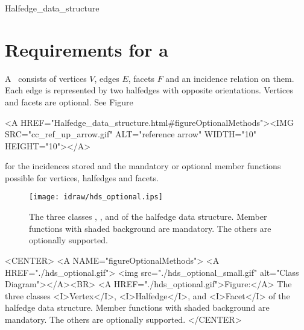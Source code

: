 \ccHtmlNoClassToc
\begin{ccClass}{Halfedge_data_structure}
\section{Requirements for a \protect{}}
\label{sectionHds}
\def\ccTagRmTrailingConst{\ccFalse}

\ccDefinition  

A \ccClassTemplateName\ consists of vertices $V$, edges $E$, facets
$F$ and an incidence relation on them.  Each edge is represented by
two halfedges with opposite orientations. Vertices and facets are
optional. See 
Figure~\ccTexHtml{\ref{figureOptionalMethods}}{}\begin{ccHtmlOnly}
  <A HREF="Halfedge_data_structure.html#figureOptionalMethods"><IMG 
  SRC="cc_ref_up_arrow.gif" ALT="reference arrow" WIDTH="10" HEIGHT="10"></A>
\end{ccHtmlOnly}
 for the incidences
stored and the mandatory or optional member functions possible for
vertices, halfedges and facets.

\begin{ccTexOnly}
    \begin{figure}
        \begin{center}
          \parbox{\textwidth}{%
              \texttt{[image: idraw/hds\_optional.ips]}%
          }
        \end{center}
        \caption{The three classes \protect{}, 
          \protect{}, and 
          \protect{} of the halfedge data structure. Member
          functions with shaded background are mandatory. The others
          are optionally supported.}
        \label{figureOptionalMethods}
    \end{figure}
\end{ccTexOnly}

\begin{ccHtmlOnly}
    <CENTER>
    <A NAME="figureOptionalMethods">
    <A HREF="./hds_optional.gif">
        <img src="./hds_optional_small.gif" 
             alt="Class Diagram"></A><BR>
    <A HREF="./hds_optional.gif">Figure:</A>
    The three classes <I>Vertex</I>, <I>Halfedge</I>, and 
          <I>Facet</I> of the halfedge data structure. Member
          functions with shaded background are mandatory. The others
          are optionally supported.
    </CENTER>
\end{ccHtmlOnly}


\end{ccClass}
